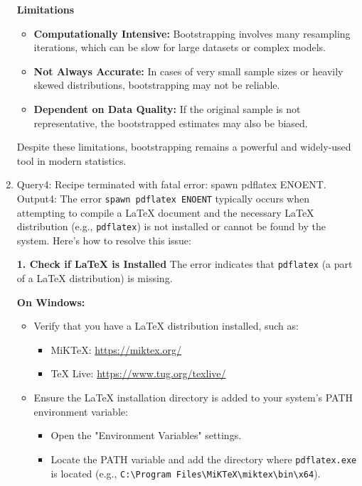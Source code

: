 \begin{enumerate}
\textbf{Limitations}
\begin{itemize}
    \item \textbf{Computationally Intensive:} Bootstrapping involves many resampling iterations, which can be slow for large datasets or complex models.
    \item \textbf{Not Always Accurate:} In cases of very small sample sizes or heavily skewed distributions, bootstrapping may not be reliable.
    \item \textbf{Dependent on Data Quality:} If the original sample is not representative, the bootstrapped estimates may also be biased.
\end{itemize}

Despite these limitations, bootstrapping remains a powerful and widely-used tool in modern statistics.

\item
Query4: Recipe terminated with fatal error: spawn pdflatex ENOENT. \\
Output4: The error \texttt{spawn pdflatex ENOENT} typically occurs when attempting to compile a LaTeX document and the necessary LaTeX distribution (e.g., \texttt{pdflatex}) is not installed or cannot be found by the system. Here's how to resolve this issue:

\textbf{1. Check if LaTeX is Installed}
The error indicates that \texttt{pdflatex} (a part of a LaTeX distribution) is missing.

\textbf{On Windows:}
\begin{itemize}
    \item Verify that you have a LaTeX distribution installed, such as:
    \begin{itemize}
        \item MiKTeX: \url{https://miktex.org/}
        \item TeX Live: \url{https://www.tug.org/texlive/}
    \end{itemize}
    \item Ensure the LaTeX installation directory is added to your system's PATH environment variable:
    \begin{itemize}
        \item Open the "Environment Variables" settings.
        \item Locate the PATH variable and add the directory where \texttt{pdflatex.exe} is located (e.g., \texttt{C:\textbackslash Program Files\textbackslash MiKTeX\textbackslash miktex\textbackslash bin\textbackslash x64}).
    \end{itemize}
\end{itemize}


\end{enumerate}
